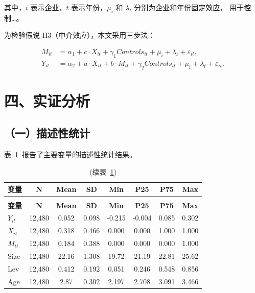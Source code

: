 \documentclass[lang=cn, aaffiliation={中国}]{ctexart}
\begin{document}
其中，$i$ 表示企业，$t$ 表示年份，$\mu_i$ 和 $\lambda_t$ 分别为企业和年份固定效应，
用于控制\dots。

为检验假说 H3（中介效应），本文采用三步法：

\begin{align}
    \label{eq:mediation}
    M_{it} &= \alpha_1 + c \cdot X_{it} + \gamma_1 Controls_{it} + \mu_i + \lambda_t + \varepsilon_{it}, \\
    Y_{it} &= \alpha_2 + a \cdot X_{it} + b \cdot M_{it} + \gamma_2 Controls_{it} + \mu_i + \lambda_t + \varepsilon_{it}.
\end{align}

\section{四、实证分析}
\label{sec:results}

\subsection{（一）描述性统计}
\label{sec:desc}

表~\ref{tab:desc}~报告了主要变量的描述性统计结果。

\begin{longtable}{lccccccc}
    \caption{描述性统计}
    \label{tab:desc}\\
    \toprule
    \textbf{变量} & \textbf{N} & \textbf{Mean} & \textbf{SD} & \textbf{Min} & \textbf{P25} & \textbf{P75} & \textbf{Max} \\
    \midrule
    \endfirsthead
    \caption{(续表~\ref{tab:desc})}\\
    \toprule
    \textbf{变量} & \textbf{N} & \textbf{Mean} & \textbf{SD} & \textbf{Min} & \textbf{P25} & \textbf{P75} & \textbf{Max} \\
    \midrule
    \endhead
    \bottomrule
    \endfoot
    $Y_{it}$ & 12,480 & 0.052 & 0.098 & -0.215 & -0.004 & 0.085 & 0.302 \\
    $X_{it}$ & 12,480 & 0.318 & 0.466 & 0.000 & 0.000 & 1.000 & 1.000 \\
    $M_{it}$ & 12,480 & 0.184 & 0.388 & 0.000 & 0.000 & 0.000 & 1.000 \\
    Size & 12,480 & 22.16 & 1.308 & 19.72 & 21.19 & 22.81 & 25.62 \\
    Lev & 12,480 & 0.412 & 0.192 & 0.051 & 0.246 & 0.548 & 0.856 \\
    Age & 12,480 & 2.87 & 0.302 & 2.197 & 2.708 & 3.091 & 3.466 \\
\end{longtable}
\end{document}
